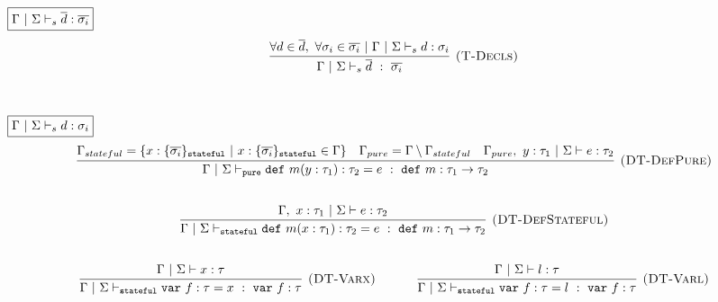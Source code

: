 \documentclass{llncs}
\newcommand{\keywadj}[1]{\mathtt{#1}}
\newcommand{\keyw}[1]{\keywadj{#1}~}
\begin{document}
$\fbox{$\Gamma~|~\Sigma \vdash_s \overline{d} : \overline{\sigma_i}$}$
\[
\begin{array}{c}
\infer[\textsc{(T-Decls)}]
  {\Gamma~|~\Sigma \vdash_{s} \overline{d}~:~\overline{\sigma_i}}
  {\forall d \in \overline{d},~\forall \sigma_i \in \overline{\sigma_i}~|~\Gamma~|~\Sigma \vdash_{s} d : \sigma_i}\\[5ex]

\end{array}
\]

$\fbox{$\Gamma~|~\Sigma \vdash_s d : \sigma_i$}$
\[
\begin{array}{c}


  
\infer[\textsc{(DT-DefPure)}]
  {\Gamma~|~\Sigma \vdash_{\keywadj{pure}} \keyw{def} m(y : \tau_1) : \tau_2 = e~:~\keyw{def} m : \tau_1 \rightarrow \tau_2}
  {\Gamma_{stateful} = \{x : \{ \overline{\sigma_i} \}_{\keywadj{stateful}} ~|~ x : \{ \overline{\sigma_i} \}_{\keywadj{stateful}} \in \Gamma\} & \Gamma_{pure} = \Gamma \setminus \Gamma_{stateful} & \Gamma_{pure},~y : \tau_1~|~\Sigma \vdash e : \tau_2}\\[5ex]

\infer[\textsc{(DT-DefStateful)}]
  {\Gamma~|~\Sigma \vdash_{\keywadj{stateful}} \keyw{def} m(x : \tau_1) : \tau_2 = e~:~\keyw{def} m : \tau_1 \rightarrow \tau_2}
  {\Gamma,~x : \tau_1~|~\Sigma \vdash e : \tau_2}\\[5ex]

\infer[\textsc{(DT-Varx)}]
  {\Gamma~|~\Sigma \vdash_{\keywadj{stateful}} \keyw{var} f : \tau = x~:~\keyw{var} f : \tau}
  {\Gamma~|~\Sigma \vdash x : \tau}%
~~~~~~~~~~
\infer[\textsc{(DT-Varl)}]
  {\Gamma~|~\Sigma \vdash_{\keywadj{stateful}} \keyw{var} f : \tau = l~:~\keyw{var} f : \tau}
  {\Gamma~|~\Sigma \vdash l : \tau}\\[5ex]

\end{array}
\]
\end{document}

